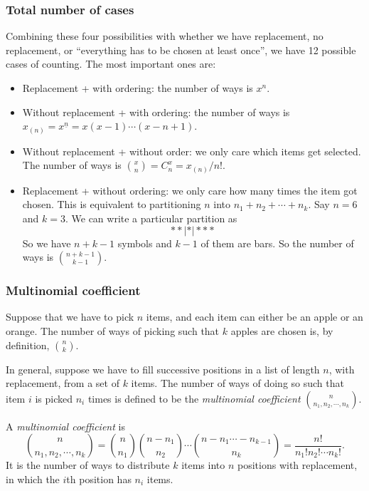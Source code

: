 \documentclass[a4paper]{article}
\begin{document}
\subsubsection*{Total number of cases}
Combining these four possibilities with whether we have replacement, no replacement, or ``everything has to be chosen at least once'', we have 12 possible cases of counting. The most important ones are:
\begin{itemize}
  \item Replacement + with ordering: the number of ways is $x^n$.
  \item Without replacement + with ordering: the number of ways is $x_{(n)} = x^{\underline{n}} = x(x - 1)\cdots (x - n + 1)$.
  \item Without replacement + without order: we only care which items get selected. The number of ways is $\binom{x}{n} = C^x_n = x_{(n)}/n!$.
  \item Replacement + without ordering: we only care how many times the item got chosen. This is equivalent to partitioning $n$ into $n_1 + n_2 + \cdots + n_k$. Say $n = 6$ and $k = 3$. We can write a particular partition as
    \[
      **|*|***
    \]
  So we have $n + k - 1$ symbols and $k - 1$ of them are bars. So the number of ways is $\binom{n + k - 1}{k - 1}$.
\end{itemize}

\subsubsection*{Multinomial coefficient}
Suppose that we have to pick $n$ items, and each item can either be an apple or an orange. The number of ways of picking such that $k$ apples are chosen is, by definition, $\binom{n}{k}$.

In general, suppose we have to fill successive positions in a list of length $n$, with replacement, from a set of $k$ items. The number of ways of doing so such that item $i$ is picked $n_i$ times is defined to be the \emph{multinomial coefficient} $\binom{n}{n_1, n_2, \cdots, n_k}$.

\begin{defi}
  A \emph{multinomial coefficient} is
  \[
    \binom{n}{n_1, n_2, \cdots, n_k} = \binom{n}{n_1}\binom{n - n_1}{n_2}\cdots \binom{n - n_1\cdots - n_{k - 1}}{n_k} = \frac{n!}{n_1!n_2!\cdots n_k!}.
  \]
  It is the number of ways to distribute $k$ items into $n$ positions with replacement, in which the $i$th position has $n_i$ items.
\end{defi}
\end{document}

